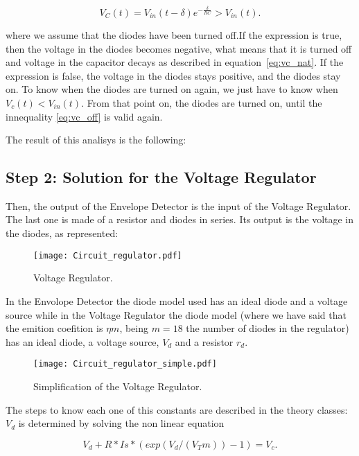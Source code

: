\begin{equation}
  V_{C}(t) = V_{in}(t-\delta) e^{-\frac{\delta}{RC}} > V_{in}(t).
  \label{eq:vc_off}
\end{equation}

where we assume that the diodes have been turned off.If the expression is true, then the voltage in the diodes becomes negative, what means that it is turned off and voltage in the capacitor decays as described in equation~\ref{eq:vc_nat}. If the expression is false, the voltage in the diodes stays positive, and the diodes stay on.
To know when the diodes are turned on again, we just have to know when $V_{c}(t)<V_{in}(t)$. From that point on, the diodes are turned on, until the innequality \ref{eq:vc_off} is valid again.

The result of this analisys is the following:


\newpage

\subsection{Step 2: Solution for the Voltage Regulator}

Then, the output of the Envelope Detector is the input of the Voltage Regulator. The last one is made of a resistor and diodes in series. Its output is the voltage in the diodes, as represented:

\begin{figure}[h] \centering
\texttt{[image: Circuit\_regulator.pdf]}
\caption{Voltage Regulator.}
\label{fig:TEO_VR_CIR}
\end{figure}

In the Envolope Detector the diode model used has an ideal diode and a voltage source while in the Voltage Regulator the diode model (where we have said that the emition coefition is $\eta m$, being $m=18$ the number of diodes in the regulator) has an ideal diode, a voltage source, $V_{d}$ and a resistor $r_{d}$. 

\begin{figure}[h] \centering
\texttt{[image: Circuit\_regulator\_simple.pdf]}
\caption{Simplification of the Voltage Regulator.}
\label{fig:TEO_VR_CIR_S}
\end{figure}

The steps to know each one of this constants are described in the theory classes:
$V_{d}$ is determined by solving the non linear equation

\begin{equation}
  V_d + R*Is*(exp(V_d/(V_Tm))-1) = V_c.
  \label{eq:Vd}
\end{equation}

